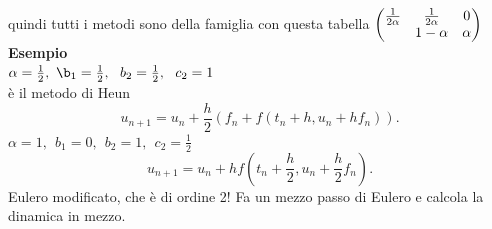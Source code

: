 \documentclass[12px]{article}
\begin{document}
quindi tutti i metodi sono della famiglia con questa tabella $\begin{pmatrix}\frac 1 {2\alpha} & \frac 1 {2\alpha} & 0\\
											 & 1 - \alpha & \alpha\end{pmatrix}$\\
 \textbf{Esempio}\\
 $\alpha = \frac 12 , \  \b_1 = \frac 12, \ \ b_2 = \frac 12, \ \ c_2 = 1$\\
 è il metodo di Heun
  \[
	  u_{n+1} = u_n + \frac h 2 (f_n + f(t_n+ h, u_n+hf_n))
 .\] 
 $\alpha = 1, \ \ b_1 = 0, \ \ b_2 = 1, \ \ c_2 = \frac 12$
 \[
	 u_{n+1} = u_n + h f (t_n + \frac h 2, u_n + \frac h 2 f_n)
 .\] 
 Eulero modificato, che è di ordine 2! Fa un mezzo passo di Eulero e calcola la dinamica in mezzo.

	
\end{document}
